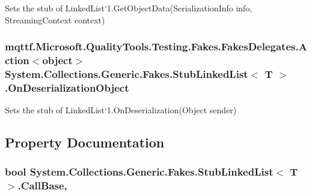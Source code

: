Sets the stub of Linked\-List`1.Get\-Object\-Data(\-Serialization\-Info info, Streaming\-Context context)

\hypertarget{class_system_1_1_collections_1_1_generic_1_1_fakes_1_1_stub_linked_list_3_01_t_01_4_afcbd7329cb628ad5e59a1f3440332990}{
\subsubsection[{On\-Deserialization\-Object}]{\setlength{\rightskip}{0pt plus 5cm}mqttf.\-Microsoft.\-Quality\-Tools.\-Testing.\-Fakes.\-Fakes\-Delegates.\-Action$<$object$>$ System.\-Collections.\-Generic.\-Fakes.\-Stub\-Linked\-List$<$ T $>$.On\-Deserialization\-Object}}\label{class_system_1_1_collections_1_1_generic_1_1_fakes_1_1_stub_linked_list_3_01_t_01_4_afcbd7329cb628ad5e59a1f3440332990}


Sets the stub of Linked\-List`1.On\-Deserialization(\-Object sender)



\subsection{Property Documentation}
\hypertarget{class_system_1_1_collections_1_1_generic_1_1_fakes_1_1_stub_linked_list_3_01_t_01_4_aac89ac349cf32b4eaef30fc668e60271}{
\subsubsection[{Call\-Base}]{\setlength{\rightskip}{0pt plus 5cm}bool System.\-Collections.\-Generic.\-Fakes.\-Stub\-Linked\-List$<$ T $>$.Call\-Base\hspace{0.3cm}{\ttfamily [get]}, {\ttfamily [set]}}}\label{class_system_1_1_collections_1_1_generic_1_1_fakes_1_1_stub_linked_list_3_01_t_01_4_aac89ac349cf32b4eaef30fc668e60271}


